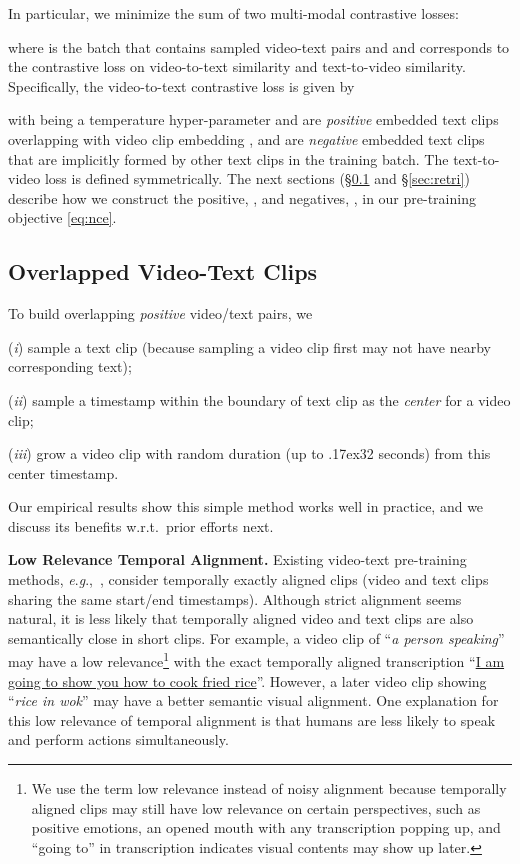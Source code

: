 \documentclass[11pt]{article}
\newcommand{\eg}{\textit{e}.\textit{g}.}
\newcommand{\app}{\raise.17ex\hbox{}}
\begin{document}
In particular, we minimize the sum of two multi-modal contrastive losses:

where  is 
the batch that contains sampled video-text pairs and  and  corresponds to the contrastive loss on video-to-text similarity and text-to-video similarity. Specifically, the video-to-text contrastive loss is given by



with  being a temperature hyper-parameter and  are \textit{positive} embedded text clips overlapping with video clip embedding , and   are \textit{negative} embedded text clips that are implicitly formed by other text clips in the training batch.
The text-to-video loss  is defined symmetrically. 
The next sections (\S\ref{sec:overlap} and \S\ref{sec:retri}) describe how we construct the positive, ,  and  negatives,  , in our pre-training objective \eqref{eq:nce}.


\subsection{Overlapped Video-Text Clips}
\label{sec:overlap}

To build overlapping \textit{positive} video/text pairs, we 

(\textit{i}) sample a text clip (because sampling a video clip first may not have nearby corresponding text); 

(\textit{ii}) sample a timestamp within the boundary of text clip as the \textit{center} for a video clip; 

(\textit{iii}) grow a video clip with random duration (up to \app32 seconds) from this center timestamp.

Our empirical results show this simple method works well in practice, and we discuss its benefits w.r.t.~prior efforts next. 


\noindent \textbf{Low Relevance Temporal Alignment.}
Existing video-text pre-training methods, \eg,~\cite{miech2019howto100m}, consider temporally exactly aligned clips (video and text clips sharing the same start/end timestamps).
Although strict alignment seems natural, it is less likely that temporally aligned video and text clips are also semantically close in short clips.
For example, a video clip of ``\textit{a person speaking}'' may have a low relevance\footnote{We use the term low relevance instead of noisy alignment because temporally aligned clips may still have low relevance on certain perspectives, such as positive emotions, an opened mouth with any transcription popping up, and ``going to'' in transcription indicates visual contents may show up later.}
with the exact temporally aligned transcription ``\underline{I am going to show you how to cook fried rice}''. However, a later video clip showing ``\textit{rice in wok}'' may have a better semantic visual alignment.
One explanation for this low relevance of temporal alignment is that humans are less likely to speak and perform actions simultaneously.
\end{document}
